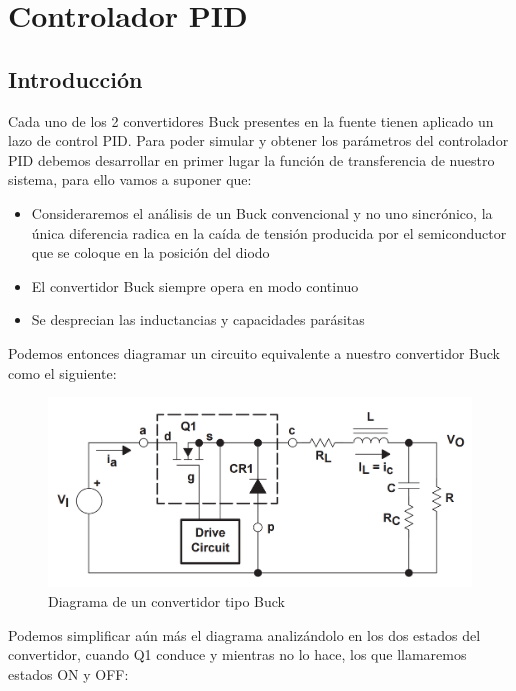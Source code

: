 \documentclass[12pt]{report}
\begin{document}
\chapter{Controlador PID}\label{chapter:pid}

\section{Introducción}

	Cada uno de los 2 convertidores Buck presentes en la fuente tienen aplicado un lazo de control PID. Para poder simular y obtener los parámetros del controlador PID debemos desarrollar en primer lugar la función de transferencia de nuestro sistema, para ello vamos a suponer que:
	
	\begin{itemize}
		\item Consideraremos el análisis de un Buck convencional y no uno sincrónico, la única diferencia radica en la caída de tensión producida por el semiconductor que se coloque en la posición del diodo
		\item El convertidor Buck siempre opera en modo continuo
		\item Se desprecian las inductancias y capacidades parásitas
	\end{itemize}

	Podemos entonces diagramar un circuito equivalente a nuestro convertidor Buck como el siguiente:
	
	\begin{figure}[H]
		\centering
		\includegraphics[width=\textwidth,height=\textheight,keepaspectratio]{buck_control_diagram}
		\caption{Diagrama de un convertidor tipo Buck}
		\label{buck:diagram}
	\end{figure}

	Podemos simplificar aún más el diagrama analizándolo en los dos estados del convertidor, cuando Q1 conduce y mientras no lo hace, los que llamaremos estados ON y OFF:
	
\end{document}
